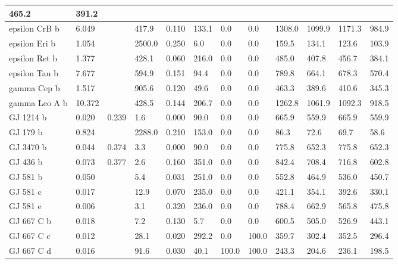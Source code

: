 \documentclass[letterpaper,10pt,english]{sphinxmanual}
\begin{document}
\begin{longtable}{|l|l|l|l|l|l|l|l|l|l|l|l|}
465.2
 & 
391.2
\\
\hline
epsilon CrB b
 & 
6.049
 &  & 
417.9
 & 
0.110
 & 
133.1
 & 
0.0
 & 
0.0
 & 
1308.0
 & 
1099.9
 & 
1171.3
 & 
984.9
\\
\hline
epsilon Eri b
 & 
1.054
 &  & 
2500.0
 & 
0.250
 & 
6.0
 & 
0.0
 & 
0.0
 & 
159.5
 & 
134.1
 & 
123.6
 & 
103.9
\\
\hline
epsilon Ret b
 & 
1.377
 &  & 
428.1
 & 
0.060
 & 
216.0
 & 
0.0
 & 
0.0
 & 
485.0
 & 
407.8
 & 
456.7
 & 
384.1
\\
\hline
epsilon Tau b
 & 
7.677
 &  & 
594.9
 & 
0.151
 & 
94.4
 & 
0.0
 & 
0.0
 & 
789.8
 & 
664.1
 & 
678.3
 & 
570.4
\\
\hline
gamma Cep b
 & 
1.517
 &  & 
905.6
 & 
0.120
 & 
49.6
 & 
0.0
 & 
0.0
 & 
463.3
 & 
389.6
 & 
410.6
 & 
345.3
\\
\hline
gamma Leo A b
 & 
10.372
 &  & 
428.5
 & 
0.144
 & 
206.7
 & 
0.0
 & 
0.0
 & 
1262.8
 & 
1061.9
 & 
1092.3
 & 
918.5
\\
\hline
GJ 1214 b
 & 
0.020
 & 
0.239
 & 
1.6
 & 
0.000
 & 
90.0
 & 
0.0
 & 
0.0
 & 
665.9
 & 
559.9
 & 
665.9
 & 
559.9
\\
\hline
GJ 179 b
 & 
0.824
 &  & 
2288.0
 & 
0.210
 & 
153.0
 & 
0.0
 & 
0.0
 & 
86.3
 & 
72.6
 & 
69.7
 & 
58.6
\\
\hline
GJ 3470 b
 & 
0.044
 & 
0.374
 & 
3.3
 & 
0.000
 & 
90.0
 & 
0.0
 & 
0.0
 & 
775.8
 & 
652.3
 & 
775.8
 & 
652.3
\\
\hline
GJ 436 b
 & 
0.073
 & 
0.377
 & 
2.6
 & 
0.160
 & 
351.0
 & 
0.0
 & 
0.0
 & 
842.4
 & 
708.4
 & 
716.8
 & 
602.8
\\
\hline
GJ 581 b
 & 
0.050
 &  & 
5.4
 & 
0.031
 & 
251.0
 & 
0.0
 & 
0.0
 & 
552.8
 & 
464.9
 & 
536.0
 & 
450.7
\\
\hline
GJ 581 c
 & 
0.017
 &  & 
12.9
 & 
0.070
 & 
235.0
 & 
0.0
 & 
0.0
 & 
421.1
 & 
354.1
 & 
392.6
 & 
330.1
\\
\hline
GJ 581 e
 & 
0.006
 &  & 
3.1
 & 
0.320
 & 
236.0
 & 
0.0
 & 
0.0
 & 
788.4
 & 
662.9
 & 
565.8
 & 
475.8
\\
\hline
GJ 667 C b
 & 
0.018
 &  & 
7.2
 & 
0.130
 & 
5.7
 & 
0.0
 & 
0.0
 & 
600.5
 & 
505.0
 & 
526.9
 & 
443.1
\\
\hline
GJ 667 C c
 & 
0.012
 &  & 
28.1
 & 
0.020
 & 
292.2
 & 
0.0
 & 
100.0
 & 
359.7
 & 
302.4
 & 
352.5
 & 
296.4
\\
\hline
GJ 667 C d
 & 
0.016
 &  & 
91.6
 & 
0.030
 & 
40.1
 & 
100.0
 & 
100.0
 & 
243.3
 & 
204.6
 & 
236.1
 & 
198.5
\\

\end{longtable}
\end{document}
